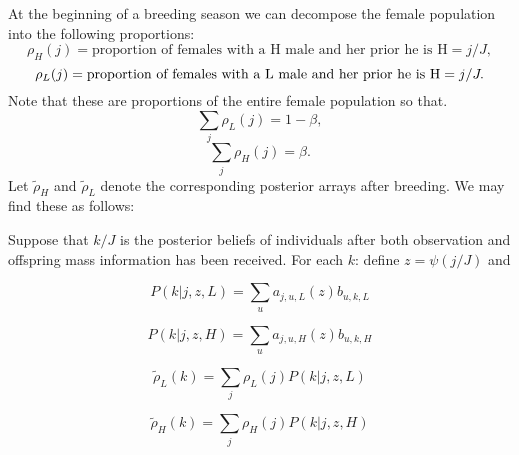 \documentclass[10pt]{article}
\begin{document}
At the beginning of a breeding season we can decompose the female
population into the following proportions: 
\[
\rho_{H}(j)=\text{proportion of females with a H male and her prior he is H}=j/J,
\]
\[
\rho_{L}(j)=\text{\text{proportion of females with a L male and her prior he is H}}=j/J.
\]
Note that these are proportions of the entire female population so
that. 
\[
\underset{j}{\boldsymbol{\sum}}\rho_{L}(j)=1-\beta,
\]
\[
\underset{j}{\boldsymbol{\sum}}\rho_{H}(j)=\beta.
\]
Let $\tilde{\rho}_{H}$ and $\tilde{\rho}_{L}$ denote the corresponding
posterior arrays after breeding. We may find these as follows: 

Suppose that $k/J$ is the posterior beliefs of individuals after
both observation and offspring mass information has been received.
For each $k$: define $z=\psi(j/J)$ and

\begin{equation}
	P(k|j,z,L)=\underset{u}{\sum}a_{j,u,L}(z)b_{u,k,L}\label{eq:-5}
\end{equation}

\begin{equation}
	P(k|j,z,H)=\underset{u}{\sum}a_{j,u,H}(z)b_{u,k,H}\label{eq:-5-1}
\end{equation}

\begin{equation}
	\tilde{\rho}_{L}(k)=\underset{j}{\sum}\rho_{L}(j)P(k|j,z,L)\label{eq:-6}
\end{equation}

\begin{equation}
	\tilde{\rho}_{H}(k)=\underset{j}{\sum}\rho_{H}(j)P(k|j,z,H)\label{eq:-7}
\end{equation}
\end{document}
